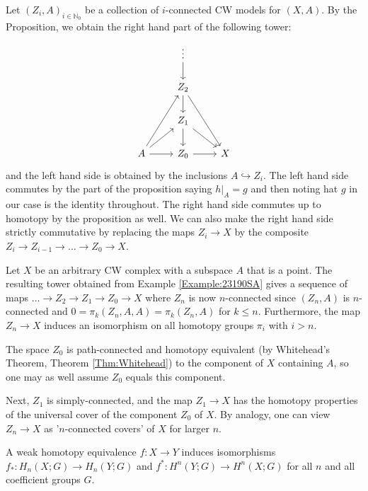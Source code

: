 \begin{example}[]\label{Example:23190SA}
Let $\left( Z_i, A \right)_{i \in \mathbb{N}_0} $ be a 
collection of $i$-connected CW models for
$(X,A)$. By the Proposition,
we obtain the right hand part of the following tower:
\begin{equation*}
\begin{tikzcd}
    & \vdots \ar[d] & \\
    & Z_2 \ar[d] \ar[ddr] &\\
    & Z_1 \ar[d] \ar[dr] & \\
    A \ar[r] \ar[ru] \ar[ruu] & Z_0 \ar[r] & X
\end{tikzcd}
\end{equation*}
and the left hand side is obtained by the inclusions
$A \hookrightarrow Z_i$.
The left hand side commutes
by the part of the proposition saying
$h |_A = g$ and then noting hat $g$ in our case
is the identity throughout. The right
hand side commutes up to homotopy by the proposition as well.
We can also make the right hand side strictly commutative
by replacing the maps
$Z_i \to X$ by the composite
$Z_i \to Z_{i-1} \to \ldots \to  Z_0 \to X$.

\end{example}

\begin{example}
    Let $X$ be an arbitrary CW complex with
    a subspace $A$ that is a point. The resulting tower
    obtained from Example \ref{Example:23190SA}
    gives a sequence
    of maps
    $\ldots \to Z_2 \to Z_1 \to Z_0 \to X$ where
    $Z_n$ is now $n$-connected since
    $(Z_n, A)$ is $n$-connected and
    $0 = \pi_k (Z_n, A, A) = \pi_k (Z_n, A)$ for
    $k\le n$. Furthermore, the map
    $Z_n \to X$ induces an isomorphism on all homotopy
    groups $\pi_i$ with $i>n$.

    The space $Z_0$ is path-connected and homotopy equivalent
    (by Whitehead's Theorem, Theorem \ref{Thm:Whitehead})
    to the component of $X$ containing $A$, so
    one may as well assume $Z_0$ equals this component.
    
    Next, $Z_1$ is simply-connected, and the map
    $Z_1 \to X$ has the homotopy properties
    of the universal cover of the component $Z_0$ of $X$.
    By analogy, one can view
    $Z_n \to X$ as '$n$-connected covers' of $X$ 
    for larger $n$.

\end{example}

\begin{proposition}[]
    A weak homotopy equivalence $f \colon X \to Y$ 
    induces isomorphisms
    $f_* \colon H_n (X;G) \to H_n(Y;G)$ and
    $f^{*} \colon H^{n}(Y;G) \to H^{n}(X;G)$ for
    all $n$ and all coefficient groups $G$.
\end{proposition}



